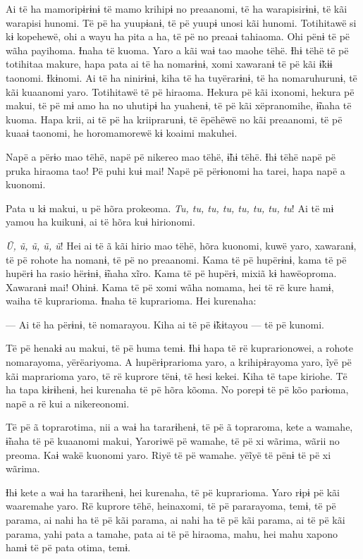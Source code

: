 Ai të ha mamoripɨrɨnɨ të mamo krihipɨ no preaanomi, të ha warapisirɨnɨ,
të kãi warapisi hunomi. Të pë ha yuupɨanɨ, të pë yuupɨ unosi kãi hunomi.
Totihitawë si kɨ kopehewë, ohi a wayu ha pita a ha, të pë no preaaɨ
tahiaoma. Ohi pënɨ të pë wãha payihoma. Ɨnaha të kuoma. Yaro a kãi waɨ
tao maohe tëhë. Ɨhɨ tëhë të pë totihitaa makure, hapa pata ai të ha
nomarɨnɨ, xomi xawaranɨ të pë kãi ɨ̃kɨɨ taonomi. Ɨkɨnomi. Ai të ha
ninirɨnɨ, kiha të ha tuyërarɨnɨ, të ha nomaruhurunɨ, të kãi kuaanomi
yaro. Totihitawë të pë hiraoma. Hekura pë kãi ixonomi, hekura pë makui,
të pë mɨ amo ha no uhutipɨ ha yuahenɨ, të pë kãi xëpranomihe, ɨ̃naha të
kuoma. Hapa krii, ai të pë ha kriiprarunɨ, të ëpëhëwë no kãi preaanomi,
të pë kuaaɨ taonomi, he horomamorewë kɨ koaimi makuhei. 

Napë a përɨo mao tëhë, napë pë nikereo mao tëhë, ɨ̃hɨ tëhë. Ɨhɨ tëhë napë
pë pruka hiraoma tao! Pë puhi kuɨ mai! Napë pë përɨonomi ha tarei, hapa
napë a kuonomi. 

Pata u kɨ makui, u pë hõra prokeoma. \textit{Tu, tu, tu, tu, tu, tu, tu, tu}! Ai
të mɨ yamou ha kuikunɨ, ai të hõra kuɨ hirionomi. 

\textit{Ũ, ũ, ũ, ũ, ũ}! Hei ai të ã kãi hirio mao tëhë, hõra kuonomi, kuwë
yaro, xawaranɨ, të pë rohote ha nomanɨ, të pë no preaanomi. Kama të pë
hupërɨnɨ, kama të pë hupërɨ ha rasio hërɨnɨ, ɨ̃naha xĩro. Kama të pë
hupërɨ, mixiã kɨ hawëoproma. Xawaranɨ mai! Ohinɨ. Kama të pë xomi wãha
nomama, hei të rë kure hamɨ, waiha të kuprarioma. Ɨnaha të kuprarioma.
Hei kurenaha: 

--- Ai të ha përɨnɨ, të nomarayou. Kiha ai të pë ɨ̃kɨtayou --- të pë
kunomi. 

Të pë henakɨ au makui, të pë huma temɨ. Ɨhɨ hapa të rë kuprarionowei, a
rohote nomarayoma, yërëariyoma. A hupërɨprarioma yaro, a krihipɨrayoma
yaro, ĩyë pë kãi maprarioma yaro, të rë kuprore tënɨ, të hesi kekei.
Kiha të tape kiriohe. Të ha tapa kɨrɨhenɨ, hei kurenaha të pë hõra
kõoma. No porepɨ të pë kõo parɨoma, napë a rë kui a nikereonomi. 

Të pë ã toprarotima, nii a waɨ ha tararɨhenɨ, të pë ã topraroma, kete a
wamahe, ɨ̃naha të pë kuaanomi makui, Yaroriwë pë wamahe, të pë xi wãrima,
wãrii no preoma. Kaɨ wakë kuonomi yaro. Riyë të pë wamahe. yëĩyë të pënɨ
të pë xi wãrima. 

Ɨhɨ kete a waɨ ha tararɨhenɨ, hei kurenaha, të pë kuprarioma. Yaro rɨpɨ
pë kãi waaremahe yaro. Rë kuprore tëhë, heinaxomi, të pë pararayoma,
temɨ, të pë parama, ai nahi ha të pë kãi parama, ai nahi ha të pë kãi
parama, ai të pë kãi parama, yahi pata a tamahe, pata ai të pë hiraoma,
mahu, hei mahu xapono hamɨ të pë pata otima, temɨ.

